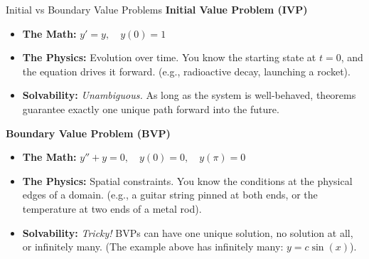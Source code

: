 \begin{frame}{Initial vs Boundary Value Problems}
\textbf{Initial Value Problem (IVP)}
\begin{itemize}
    \item \textbf{The Math:} $y' = y, \quad y(0) = 1$
    \item \textbf{The Physics:} Evolution over time. You know the starting state at $t=0$, and the equation drives it forward. (e.g., radioactive decay, launching a rocket).
    \item \textbf{Solvability:} \textit{Unambiguous.} As long as the system is well-behaved, theorems guarantee exactly one unique path forward into the future.
\end{itemize}

\vspace{0.4cm}

\textbf{Boundary Value Problem (BVP)}
\begin{itemize}
    \item \textbf{The Math:} $y'' + y = 0, \quad y(0)=0, \quad y(\pi)=0$
    \item \textbf{The Physics:} Spatial constraints. You know the conditions at the physical edges of a domain. (e.g., a guitar string pinned at both ends, or the temperature at two ends of a metal rod).
    \item \textbf{Solvability:} \textit{Tricky!} BVPs can have one unique solution, no solution at all, or infinitely many. (The example above has infinitely many: $y = c \sin(x)$).
\end{itemize}
\end{frame}
